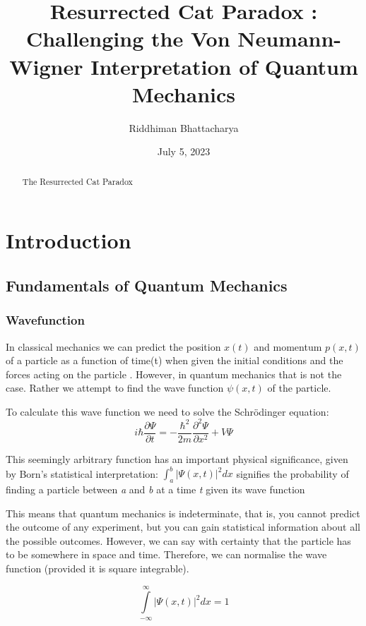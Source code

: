 \documentclass{article}
\title{\huge \textbf{Resurrected Cat Paradox : Challenging the Von Neumann-Wigner Interpretation of Quantum Mechanics}}
\author{Riddhiman Bhattacharya}
\date{July 5, 2023}
\begin{document}
\maketitle
\Large
\begin{abstract}
The Resurrected Cat Paradox 
\end{abstract}

\section{Introduction}
\subsection{Fundamentals of Quantum Mechanics}

\subsubsection{Wavefunction}
In classical mechanics we can predict the position $x(t)$ and momentum $p(x,t)$ of a particle as a function of time(t) when given the initial conditions and the forces acting on the particle \cite{Griffiths2004Introduction}. However, in quantum mechanics that is not the case. Rather we attempt to find the wave function  $\psi(x,t)$ of the particle.

To calculate this wave function we need to solve the Schr\"{o}dinger equation:
\begin{equation}
i\hbar \frac{\partial \Psi}{\partial t} = -\frac{\hbar^2}{2m}
\frac{\partial^2 \Psi}{\partial x^2} + V \Psi
\label{eq:1}
\end{equation}

This seemingly arbitrary function has an important physical significance, given by Born's statistical interpretation: $\int_a^b |\Psi(x,t)|^2 dx$ signifies the probability of finding a particle between \textit{a} and \textit{b} at a time \textit{t} given its wave function


This means that quantum mechanics is indeterminate, that is, you cannot predict the outcome of any experiment, but you can gain statistical information about all the possible outcomes. However, we can say with certainty that the particle has to be somewhere  in space and time. Therefore, we can normalise the wave function (provided it is square integrable).

\begin{equation}
\int\limits_{-\infty}^\infty |\Psi(x,t)|^2 dx = 1
\label{eq:2}
\end{equation}
\end{document}
